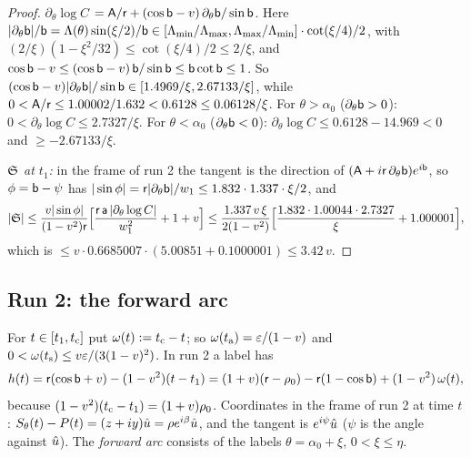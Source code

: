 \begin{proof}
\emph{$\partial_\theta\log C$} $=\mathsf A/\mathsf r+(\cos\mathsf b-v)\,\partial_\theta\mathsf b/\sin\mathsf b$. Here
$|\partial_\theta\mathsf b|/\mathsf b=\Lambda(\theta)\sin(\xi/2)/\mathsf b\in[\Lambda_{\min}/\Lambda_{\max},\Lambda_{\max}/\Lambda_{\min}]\cdot\cot(\xi/4)/2$,
with $(2/\xi)(1-\xi^2/32)\le\cot(\xi/4)/2\le2/\xi$, and
$\cos\mathsf b-v\le(\cos\mathsf b-v)\,\mathsf b/\sin\mathsf b\le\mathsf b\cot\mathsf b\le1$. So
$(\cos\mathsf b-v)|\partial_\theta\mathsf b|/\sin\mathsf b\in[1.4969/\xi,2.67133/\xi]$, while $0<\mathsf A/\mathsf r\le1.00002/1.632<0.6128\le0.06128/\xi$. For
$\theta>\alpha_0$ ($\partial_\theta\mathsf b>0$): $0<\partial_\theta\log C\le2.7327/\xi$. For $\theta<\alpha_0$ ($\partial_\theta\mathsf b<0$):
$\partial_\theta\log C\le0.6128-14.969<0$ and $\ge-2.67133/\xi$.

\emph{$\mathfrak S$ at $t_1$:} in the frame of run 2 the tangent is the direction of $(\mathsf A+i\mathsf r\,\partial_\theta\mathsf b)e^{i\mathsf b}$, so
$\phi=\mathsf b-\psi$ has $|\sin\phi|=\mathsf r|\partial_\theta\mathsf b|/w_1\le1.832\cdot1.337\cdot\xi/2$, and
\[
|\mathfrak S|\le\frac{v|\sin\phi|}{(1-v^2)\mathsf r}\Bigl[\frac{\mathsf r\,\mathsf a\,|\partial_\theta\log C|}{w_1^2}+1+v\Bigr]
\le\frac{1.337\,v\,\xi}{2(1-v^2)}\Bigl[\frac{1.832\cdot1.00044\cdot2.7327}\xi+1.000001\Bigr],
\]
which is $\le v\cdot0.6685007\cdot(5.00851+0.1000001)\le3.42\,v$.
\end{proof}

\subsection{Run 2: the forward arc}\label{sec:T1-fwd}

For $t\in[t_1,t_{\mathrm c}]$ put $\omega(t):=t_{\mathrm c}-t$; so $\omega(t_{\mathrm a})=\varepsilon/(1-v)$ and $0<\omega(t_{\mathrm s})\le v\varepsilon/(3(1-v)^2)$. In run
2 a label has
\begin{equation}\label{eq:T1-h}
h(t)=\mathsf r(\cos\mathsf b+v)-(1-v^2)(t-t_1)=(1+v)(\mathsf r-\rho_0)-\mathsf r(1-\cos\mathsf b)+(1-v^2)\,\omega(t),
\end{equation}
because $(1-v^2)(t_{\mathrm c}-t_1)=(1+v)\rho_0$. Coordinates in the frame of run 2 at time $t$: $S_\theta(t)-P(t)=(z+iy)\hat u=\rho e^{i\beta}\hat u$,
and the tangent is $e^{i\psi}\hat u$ ($\psi$ is the angle against $\hat u$). The \emph{forward arc} consists of the labels
$\theta=\alpha_0+\xi$, $0<\xi\le\eta$.

